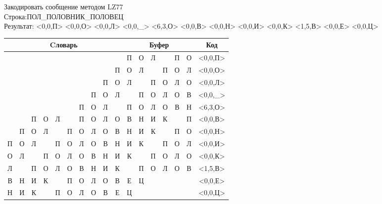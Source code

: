 \documentclass[a4paper, 12pt]{article}
\begin{document}
Закодировать сообщение методом LZ77\\
Строка:ПОЛ\_ПОЛОВНИК\_ПОЛОВЕЦ\\
Результат: <0,0,П> <0,0,О> <0,0,Л> <0,0,\_> <6,3,О> <0,0,В> <0,0,Н> <0,0,И> <0,0,К> <1,5,В> <0,0,Е> <0,0,Ц>\\
\begin{table}[h!]
\centering
\begin{tabular}{|c|c|c|c|c|c|c|c|c|c|c|c|c|c|c|c|c|} 
\hline
\multicolumn{10}{|c|}{Cловарь} & \multicolumn{6}{c|}{Буфер} & Код  \\ \hline
  &   &   &   &   &   &   &   &   &   & \cellcolor[HTML]{8CE4F6} П & О & Л &   & П & О & <0,0,П>
\\ \hline
  &   &   &   &   &   &   &   &   & П & \cellcolor[HTML]{8CE4F6} О & Л &   & П & О & Л & <0,0,О>
\\ \hline
  &   &   &   &   &   &   &   & П & О & \cellcolor[HTML]{8CE4F6} Л &   & П & О & Л & О & <0,0,Л>
\\ \hline
  &   &   &   &   &   &   & П & О & Л & \cellcolor[HTML]{8CE4F6}   & П & О & Л & О & В & <0,0,\_>
\\ \hline
  &   &   &   &   &   & \cellcolor[HTML]{FFFF00} П & \cellcolor[HTML]{FFFF00} О & \cellcolor[HTML]{FFFF00} Л &   & \cellcolor[HTML]{FFFF00} П & \cellcolor[HTML]{FFFF00} О & \cellcolor[HTML]{FFFF00} Л & \cellcolor[HTML]{8CE4F6} О & В & Н & <6,3,О>
\\ \hline
  &   & П & О & Л &   & П & О & Л & О & \cellcolor[HTML]{8CE4F6} В & Н & И & К &   & П & <0,0,В>
\\ \hline
  & П & О & Л &   & П & О & Л & О & В & \cellcolor[HTML]{8CE4F6} Н & И & К &   & П & О & <0,0,Н>
\\ \hline
П & О & Л &   & П & О & Л & О & В & Н & \cellcolor[HTML]{8CE4F6} И & К &   & П & О & Л & <0,0,И>
\\ \hline
О & Л &   & П & О & Л & О & В & Н & И & \cellcolor[HTML]{8CE4F6} К &   & П & О & Л & О & <0,0,К>
\\ \hline
Л & \cellcolor[HTML]{FFFF00}   & \cellcolor[HTML]{FFFF00} П & \cellcolor[HTML]{FFFF00} О & \cellcolor[HTML]{FFFF00} Л & \cellcolor[HTML]{FFFF00} О & В & Н & И & К & \cellcolor[HTML]{FFFF00}   & \cellcolor[HTML]{FFFF00} П & \cellcolor[HTML]{FFFF00} О & \cellcolor[HTML]{FFFF00} Л & \cellcolor[HTML]{FFFF00} О & \cellcolor[HTML]{8CE4F6} В & <1,5,В>
\\ \hline
В & Н & И & К &   & П & О & Л & О & В & \cellcolor[HTML]{8CE4F6} Е & Ц &   &   &   &   & <0,0,Е>
\\ \hline
Н & И & К &   & П & О & Л & О & В & Е & \cellcolor[HTML]{8CE4F6} Ц &   &   &   &   &   & <0,0,Ц>
\\ \hline
\end{tabular}
\end{table}
\end{document}

